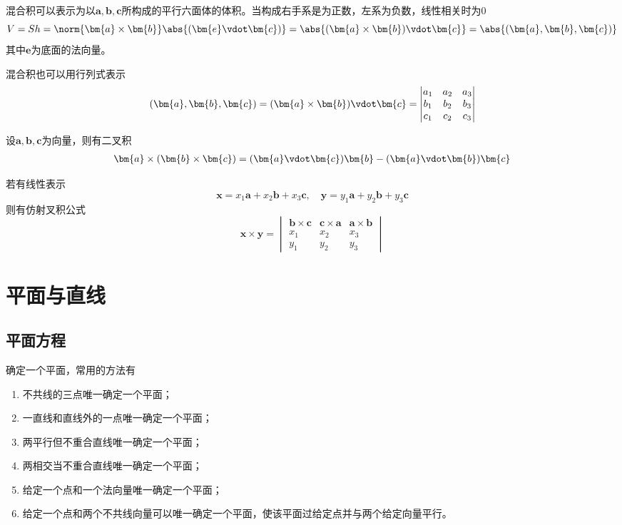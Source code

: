 混合积可以表示为以$\bm{a},\bm{b},\bm{c}$所构成的平行六面体的体积。当构成右手系是为正数，左系为负数，线性相关时为$0$
\begin{equation}
    V = Sh = \norm{\bm{a}\times\bm{b}} \abs{(\bm{e}\vdot\bm{c})} = \abs{(\bm{a}\times\bm{b})\vdot\bm{c}} = \abs{(\bm{a},\bm{b},\bm{c})}
\end{equation}
其中$\bm{e}$为底面的法向量。

混合积也可以用行列式表示
\begin{equation}
    (\bm{a},\bm{b},\bm{c}) = (\bm{a}\times\bm{b})\vdot\bm{c}
    =
    \begin{vmatrix}
        a_1 & a_2 & a_3 \\
        b_1 & b_2 & b_3 \\
        c_1 & c_2 & c_3 \\
    \end{vmatrix}
\end{equation}

设$\bm{a},\bm{b},\bm{c}$为向量，则有二叉积
\begin{eqnarray}
    \label{eq:二叉积}
    \bm{a}\times(\bm{b}\times\bm{c}) = (\bm{a}\vdot\bm{c})\bm{b} - (\bm{a}\vdot\bm{b})\bm{c}
\end{eqnarray}

若有线性表示
\[ \bm{x} = x_1\bm{a} + x_2\bm{b} + x_3\bm{c}, \quad \bm{y} = y_1\bm{a} + y_2\bm{b} + y_3\bm{c} \]
则有仿射叉积公式
\begin{equation}
    \bm{x}\times\bm{y}=
    \begin{vmatrix}
        \bm{b}\times\bm{c} & \bm{c}\times\bm{a} & \bm{a}\times\bm{b} \\
        x_1                & x_2                & x_3                \\
        y_1                & y_2                & y_3
    \end{vmatrix}
\end{equation}

\section{平面与直线}
\subsection{平面方程}
确定一个平面，常用的方法有
\begin{enumerate}[(1)]
    \item 不共线的三点唯一确定一个平面；
    \item 一直线和直线外的一点唯一确定一个平面；
    \item 两平行但不重合直线唯一确定一个平面；
    \item 两相交当不重合直线唯一确定一个平面；
    \item 给定一个点和一个法向量唯一确定一个平面；
    \item 给定一个点和两个不共线向量可以唯一确定一个平面，使该平面过给定点并与两个给定向量平行。
\end{enumerate}
